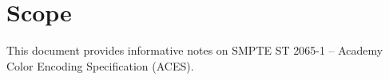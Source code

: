 \cleardoublepage
\numberedformat	
\chapter{Scope} 	%

This document provides informative notes on SMPTE ST 2065-1 -- Academy Color Encoding Specification (ACES).